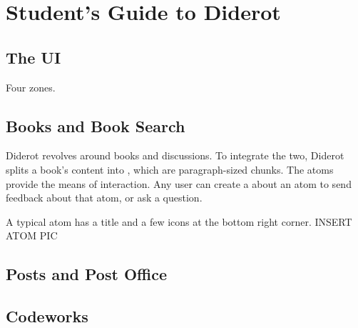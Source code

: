 \chapter{Student's Guide to Diderot}


\section{The UI}

Four zones.

\section{Books and Book Search}

Diderot revolves around books and discussions.
%
To integrate the two, Diderot splits a book's content into , which are paragraph-sized chunks. 
%
The atoms provide the means of interaction. 
%
Any user can create a  about an atom to send feedback about that atom, or ask a question.
%

\begin{example}
A typical atom has a title and a few icons at the bottom right corner.
%
INSERT ATOM PIC 
\end{example}

\section{Posts and Post Office}


\section{Codeworks}


